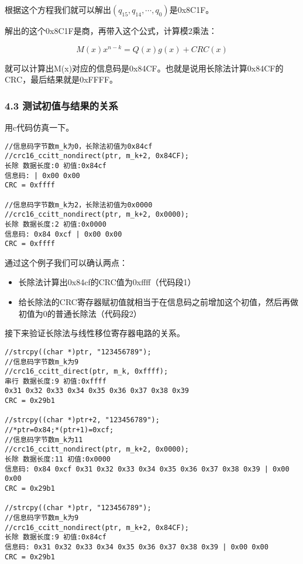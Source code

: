 \documentclass[
]{article}
\begin{document}
根据这个方程我们就可以解出$(q_{15},q_{14},\cdots,q_0)$是0x8C1F。

解出的这个0x8C1F是商，再带入这个公式，计算模2乘法：

$$
M(x)x^{n-k}=Q(x)g(x)+CRC(x)
$$

就可以计算出M(x)对应的信息码是0x84CF。也就是说用长除法计算0x84CF的CRC，最后结果就是0xFFFF。

\hypertarget{header-n220}{%
\subsubsection{4.3 测试初值与结果的关系}\label{header-n220}}

用c代码仿真一下。

\begin{verbatim}
//信息码字节数m_k为0，长除法初值为0x84cf
//crc16_ccitt_nondirect(ptr, m_k+2, 0x84CF);
长除 数据长度:0 初值:0x84cf
信息码: | 0x00 0x00
CRC = 0xffff

//信息码字节数m_k为2，长除法初值为0x0000
//crc16_ccitt_nondirect(ptr, m_k+2, 0x0000);
长除 数据长度:2 初值:0x0000
信息码: 0x84 0xcf | 0x00 0x00
CRC = 0xffff
\end{verbatim}

通过这个例子我们可以确认两点：

\begin{itemize}
\item
  长除法计算出0x84cf的CRC值为0xffff（代码段1）
\item
  给长除法的CRC寄存器赋初值就相当于在信息码之前增加这个初值，然后再做初值为0的普通长除法（代码段2）
\end{itemize}

接下来验证长除法与线性移位寄存器电路的关系。

\begin{verbatim}
//strcpy((char *)ptr, "123456789");
//信息码字节数m_k为9
//crc16_ccitt_direct(ptr, m_k, 0xffff);
串行 数据长度:9 初值:0xffff
0x31 0x32 0x33 0x34 0x35 0x36 0x37 0x38 0x39
CRC = 0x29b1

//strcpy((char *)ptr+2, "123456789");
//*ptr=0x84;*(ptr+1)=0xcf;
//信息码字节数m_k为11
//crc16_ccitt_nondirect(ptr, m_k+2, 0x0000);
长除 数据长度:11 初值:0x0000
信息码: 0x84 0xcf 0x31 0x32 0x33 0x34 0x35 0x36 0x37 0x38 0x39 | 0x00 0x00
CRC = 0x29b1

//strcpy((char *)ptr, "123456789");
//信息码字节数m_k为9
//crc16_ccitt_nondirect(ptr, m_k+2, 0x84CF);
长除 数据长度:9 初值:0x84cf
信息码: 0x31 0x32 0x33 0x34 0x35 0x36 0x37 0x38 0x39 | 0x00 0x00
CRC = 0x29b1
\end{verbatim}
\end{document}
